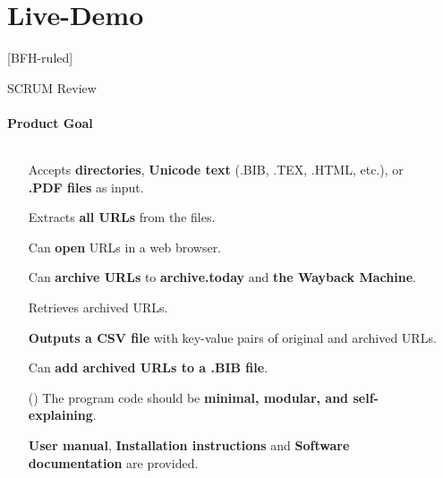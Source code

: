 \documentclass[
ngerman,%
authorontitle=true,
]{bfhbeamer}
\begin{document}
	\section{Live-Demo}
	[BFH-ruled]
	\frame{\sectionpage}
	
	\begin{frame}{SCRUM Review}
		\framesubtitle{Product Goal}
		\begin{columns} %
			\begin{column}{0.8\textwidth} %
				\begin{itemize}
					\item[\checkmark] Accepts \textbf{directories}, \textbf{Unicode text} (.BIB, .TEX, .HTML, etc.), or \textbf{.PDF files} as input.
					\item[\checkmark] Extracts \textbf{all URLs} from the files.
					\item[\checkmark] Can \textbf{open} URLs in a web browser.
					\item[\checkmark] Can \textbf{archive URLs} to \textbf{archive.today} and \textbf{the Wayback Machine}.
					\item[\checkmark] Retrieves archived URLs.
					\item[\checkmark] \textbf{Outputs a CSV file} with key-value pairs of original and archived URLs.
					\item[\checkmark] Can \textbf{add archived URLs to a .BIB file}.
					\item[(\checkmark)] The program code should be \textbf{minimal, modular, and self-explaining}.
					\item[\checkmark] \textbf{User manual}, \textbf{Installation instructions} and \textbf{Software documentation} are provided.
				\end{itemize}
			\end{column}
			\begin{column}{0.2\textwidth} %
			\end{column}
		\end{columns} %
	\end{frame}
	
\end{document}
